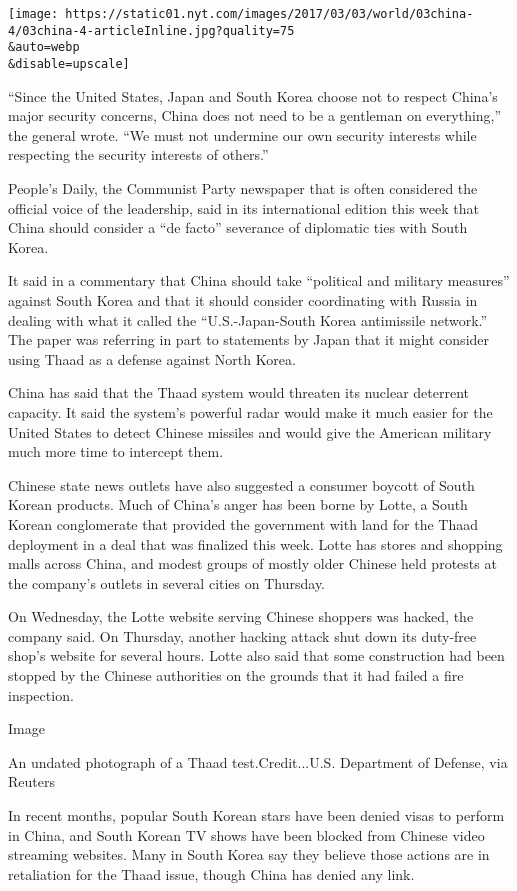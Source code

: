 \texttt{[image: https://static01.nyt.com/images/2017/03/03/world/03china-4/03china-4-articleInline.jpg?quality=75\\\&auto=webp\\\&disable=upscale]}

``Since the United States, Japan and South Korea choose not to respect
China's major security concerns, China does not need to be a gentleman
on everything,'' the general wrote. ``We must not undermine our own
security interests while respecting the security interests of others.''

People's Daily, the Communist Party newspaper that is often considered
the official voice of the leadership, said in its international edition
this week that China should consider a ``de facto'' severance of
diplomatic ties with South Korea.

It said in a commentary that China should take ``political and military
measures'' against South Korea and that it should consider coordinating
with Russia in dealing with what it called the ``U.S.-Japan-South Korea
antimissile network.'' The paper was referring in part to statements by
Japan that it might consider using Thaad as a defense against North
Korea.

China has said that the Thaad system would threaten its nuclear
deterrent capacity. It said the system's powerful radar would make it
much easier for the United States to detect Chinese missiles and would
give the American military much more time to intercept them.

Chinese state news outlets have also suggested a consumer boycott of
South Korean products. Much of China's anger has been borne by Lotte, a
South Korean conglomerate that provided the government with land for the
Thaad deployment in a deal that was finalized this week. Lotte has
stores and shopping malls across China, and modest groups of mostly
older Chinese held protests at the company's outlets in several cities
on Thursday.

On Wednesday, the Lotte website serving Chinese shoppers was hacked, the
company said. On Thursday, another hacking attack shut down its
duty-free shop's website for several hours. Lotte also said that some
construction had been stopped by the Chinese authorities on the grounds
that it had failed a fire inspection.

Image

An undated photograph of a Thaad test.Credit...U.S. Department of
Defense, via Reuters

In recent months, popular South Korean stars have been denied visas to
perform in China, and South Korean TV shows have been blocked from
Chinese video streaming websites. Many in South Korea say they believe
those actions are in retaliation for the Thaad issue, though China has
denied any link.

